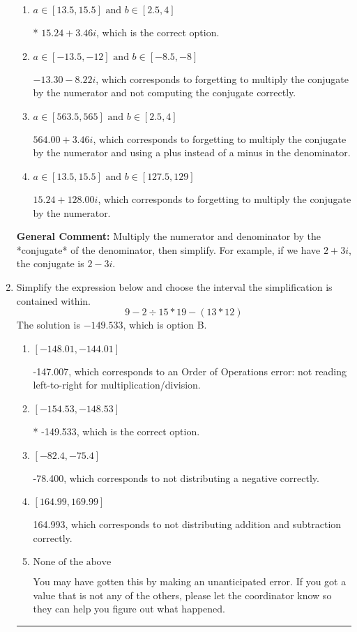\documentclass{extbook}[14pt]
\newcommand{\litem}[1]{\item #1

\rule{\textwidth}{0.4pt}}
\begin{document}
\begin{enumerate}
{\begin{enumerate}[label=\Alph*.]
 $36.00  + 14.67 i$, which corresponds to just dividing the first term by the first term and the second by the second.
\item \( a \in [13.5, 15.5] \text{ and } b \in [2.5, 4] \)

* $15.24  + 3.46 i$, which is the correct option.
\item \( a \in [-13.5, -12] \text{ and } b \in [-8.5, -8] \)

 $-13.30  - 8.22 i$, which corresponds to forgetting to multiply the conjugate by the numerator and not computing the conjugate correctly.
\item \( a \in [563.5, 565] \text{ and } b \in [2.5, 4] \)

 $564.00  + 3.46 i$, which corresponds to forgetting to multiply the conjugate by the numerator and using a plus instead of a minus in the denominator.
\item \( a \in [13.5, 15.5] \text{ and } b \in [127.5, 129] \)

 $15.24  + 128.00 i$, which corresponds to forgetting to multiply the conjugate by the numerator.
\end{enumerate}

\textbf{General Comment:} Multiply the numerator and denominator by the *conjugate* of the denominator, then simplify. For example, if we have $2+3i$, the conjugate is $2-3i$.
}
\litem{
Simplify the expression below and choose the interval the simplification is contained within.
\[ 9 - 2 \div 15 * 19 - (13 * 12) \]The solution is \( -149.533 \), which is option B.\begin{enumerate}[label=\Alph*.]
\item \( [-148.01, -144.01] \)

 -147.007, which corresponds to an Order of Operations error: not reading left-to-right for multiplication/division.
\item \( [-154.53, -148.53] \)

* -149.533, which is the correct option.
\item \( [-82.4, -75.4] \)

 -78.400, which corresponds to not distributing a negative correctly.
\item \( [164.99, 169.99] \)

 164.993, which corresponds to not distributing addition and subtraction correctly.
\item \( \text{None of the above} \)

 You may have gotten this by making an unanticipated error. If you got a value that is not any of the others, please let the coordinator know so they can help you figure out what happened.
\end{enumerate}

}
\end{enumerate}
\end{document}
